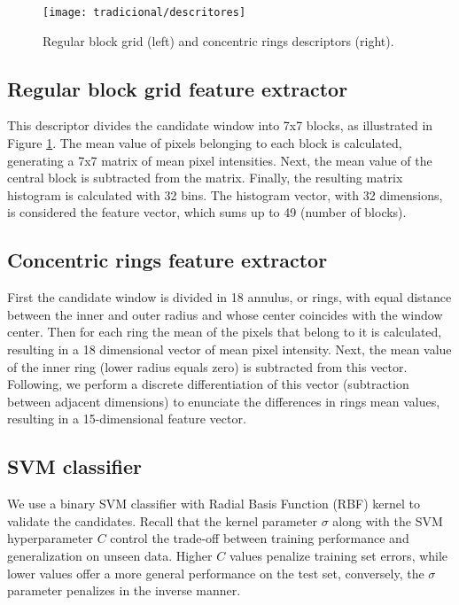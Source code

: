     \begin{figure}
    \centering
    \texttt{[image: tradicional/descritores]}
    \caption{Regular block grid (left) and concentric rings descriptors (right).}
    \label{fig:descriptors}
    \end{figure}

    \subsection{Regular block grid feature extractor}
      This descriptor divides the candidate window into 7x7 blocks, as illustrated in Figure \ref{fig:descriptors}. The mean value of pixels belonging to each block is calculated, generating a 7x7 matrix of mean pixel intensities. Next, the mean value of the central block is subtracted from the matrix. Finally, the resulting matrix histogram is calculated with 32 bins. The histogram vector, with 32 dimensions, is considered the feature vector, which sums up to 49 (number of blocks).

    \subsection{Concentric rings feature extractor}
       First the candidate window is divided in 18 annulus, or rings, with equal distance between the inner and outer radius and whose center coincides with the window center. Then for each ring the mean of the pixels that belong to it is calculated, resulting in a 18 dimensional vector of mean pixel intensity. Next, the mean value of the inner ring (lower radius equals zero) is subtracted from this vector. Following, we perform a discrete differentiation of this vector (subtraction between adjacent dimensions) to enunciate the differences in rings mean values, resulting in a 15-dimensional feature vector.

    \subsection{SVM classifier}
      We use a binary SVM classifier with Radial Basis Function (RBF) kernel \cite{rbfkernel} to validate the candidates. Recall that the kernel parameter $\sigma$ along with the SVM hyperparameter $C$ control the trade-off between training performance and generalization on unseen data. Higher $C$ values penalize training set errors, while lower values offer a more general performance on the test set, conversely, the $\sigma$ parameter penalizes in the inverse manner.

